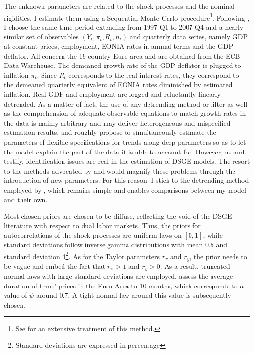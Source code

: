 \documentclass[a4paper]{article}
\begin{document}
The unknown parameters are related to the shock processes and the nominal rigidities. I estimate them using a Sequential Monte Carlo procedure\footnote{See \citet{RePEc:pup:pbooks:10612} for an extensive treatment of this method.}. Following \citet{thomas2009labor}, I choose the same time period extending from 1997-Q1 to 2007-Q4 and a nearly similar set of observables $\left( Y_t, \pi_t, R_t, n_t \right)$ and quarterly data series, namely GDP at constant prices, employment, EONIA rates in annual terms and the GDP deflator. All concern the 19-country Euro area and are obtained from the ECB Data Warehouse. The demeaned growth rate of the GDP deflator is plugged to inflation $\pi_t$. Since $R_t$ corresponds to the real interest rates, they correspond to the demeaned quarterly equivalent of EONIA rates diminished by estimated inflation. Real GDP and employment are logged and reluctantly linearly detrended. As a matter of fact, the use of any detrending method or filter as well as the comprehension of adequate observable equations to match growth rates in the data is mainly arbitrary and may deliver heterogeneous and mispecified estimation results. \citet{RePEc:bpj:bejmac:v:11:y:2011:i:1:n:25} and \citet{CANOVA20141} roughly propose to simultaneously estimate the parameters of flexible specifications for trends along deep parameters so as to let the model explain the part of the data it is able to account for. However, as \citet{CANOVA2009431} and \citet{ISKREV2010189, iskrev2010evaluating} testify, identification issues are real in the estimation of DSGE models. The resort to the methods advocated by \citet{RePEc:bpj:bejmac:v:11:y:2011:i:1:n:25} and \citet{CANOVA20141} would magnify these problems through the introduction of new parameters. For this reason, I stick to the detrending method employed by \citet{thomas2009labor}, which remains simple and enables comparisons between my model and their own.

Most chosen priors are chosen to be diffuse, reflecting the void of the DSGE literature with respect to dual labor markets. Thus, the priors for autocorrelations of the shock processes are uniform laws on $[0,1]$, while standard deviations follow inverse gamma distributions with mean 0.5 and standard deviation 4\footnote{Standard deviations are expressed in percentage}. As for the Taylor parameters $r_\pi$ and $r_y$, the prior needs to be vague and embed the fact that $r_\pi > 1$ and $r_y > 0$. As a result, truncated normal laws with large standard deviations are employed. \citet{DRUANT2012772} assess the average duration of firms' prices in the Euro Area to 10 months, which corresponds to a value of $\psi$ around 0.7. A tight normal law around this value is subsequently chosen.
\end{document}
